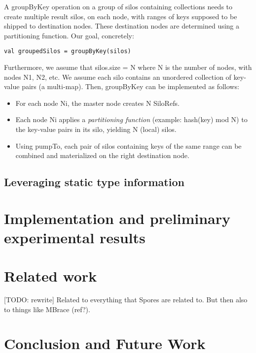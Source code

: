 \documentclass{easychair}
\begin{document}
A groupByKey operation on a group of silos containing collections needs to create multiple result silos, on each node, with ranges of keys supposed to be shipped to destination nodes. These destination nodes are determined using a partitioning function. Our goal, concretely:
\begin{verbatim}
val groupedSilos = groupByKey(silos)
\end{verbatim}
\noindent
Furthermore, we assume that silos.size = N where N is the number of nodes,
with nodes N1, N2, etc. We assume each silo contains an unordered collection
of key-value pairs (a multi-map). Then, groupByKey can be implemented as
follows:
\begin{itemize}
\item For each node Ni, the master node creates N SiloRefs.
\item Each node Ni applies a \emph{partitioning function} (example: hash(key) mod N) to
      the key-value pairs in its silo, yielding N (local) silos.
\item Using pumpTo, each pair of silos containing keys of the same range can be combined
      and materialized on the right destination node.
\end{itemize}



\subsection{Leveraging static type information}


\section{Implementation and preliminary experimental results}
\label{sec:experimental}


\section{Related work}


[TODO: rewrite] Related to everything that Spores are related to. But then
also to things like MBrace (ref?).


\section{Conclusion and Future Work}
\label{sec:conclusion}

%
\begin{spacing}{0.9}


\end{spacing}
\end{document}
